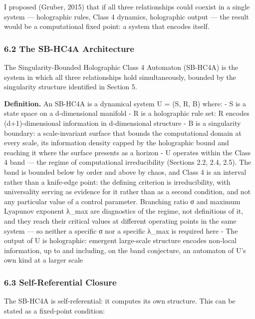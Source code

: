 \documentclass[
]{article}
\begin{document}
I proposed (Gruber, 2015) that if all three relationships could coexist
in a single system --- holographic rules, Class 4 dynamics, holographic
output --- the result would be a computational fixed point: a system
that encodes itself.

\hypertarget{the-sb-hc4a-architecture}{%
\subsubsection{6.2 The SB-HC4A
Architecture}\label{the-sb-hc4a-architecture}}

The Singularity-Bounded Holographic Class 4 Automaton (SB-HC4A) is the
system in which all three relationships hold simultaneously, bounded by
the singularity structure identified in Section 5.

\textbf{Definition.} An SB-HC4A is a dynamical system U = (S, R, B)
where: - S is a state space on a d-dimensional manifold - R is a
holographic rule set: R encodes (d+1)-dimensional information in
d-dimensional structure - B is a singularity boundary: a scale-invariant
surface that bounds the computational domain at every scale, its
information density capped by the holographic bound and reaching it
where the surface presents as a horizon - U operates within the Class 4
band --- the regime of computational irreducibility (Sections 2.2, 2.4,
2.5). The band is bounded below by order and above by chaos, and Class 4
is an interval rather than a knife-edge point: the defining criterion is
irreducibility, with universality serving as evidence for it rather than
as a second condition, and not any particular value of a control
parameter. Branching ratio σ and maximum Lyapunov exponent λ\_max are
diagnostics of the regime, not definitions of it, and they reach their
critical values at different operating points in the same system --- so
neither a specific σ nor a specific λ\_max is required here - The output
of U is holographic: emergent large-scale structure encodes non-local
information, up to and including, on the band conjecture, an automaton
of U's own kind at a larger scale

\hypertarget{self-referential-closure}{%
\subsubsection{6.3 Self-Referential
Closure}\label{self-referential-closure}}

The SB-HC4A is self-referential: it computes its own structure. This can
be stated as a fixed-point condition:
\end{document}
